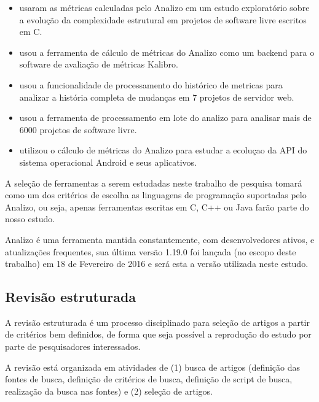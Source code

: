 \begin{itemize}

  \item \cite{Terceiro2009} usaram as métricas calculadas pelo Analizo em um
    estudo exploratório sobre a evolução da complexidade estrutural em
    projetos de software livre escritos em C.

  \item \cite{Morais2009} usou a ferramenta de cálculo de métricas do Analizo
    como um backend para o software de avaliação de métricas Kalibro.

  \item \cite{Terceiro2010} usou a funcionalidade de processamento do histórico
    de metricas para analizar a história completa de mudanças em 7 projetos de
    servidor web.

  \item \cite{Meirelles2010} usou a ferramenta de processamento em lote do
    analizo para analisar mais de 6000 projetos de software livre.

  \item \cite{Ronaldo2015} utilizou o cálculo de métricas do Analizo para
    estudar a ecoluçao da API do sistema operacional Android e seus aplicativos.

\end{itemize}

A seleção de ferramentas a serem estudadas neste trabalho de pesquisa tomará
como um dos critérios de escolha as linguagens de programação suportadas pelo
Analizo, ou seja, apenas ferramentas escritas em C, C++ ou Java farão parte do
nosso estudo.

Analizo é uma ferramenta mantida constantemente, com desenvolvedores ativos, e
atualizações frequentes, sua última versão 1.19.0 foi lançada (no escopo deste
trabalho) em 18 de
Fevereiro de 2016 e será esta a versão utilizada neste estudo.

\subsection{Revisão estruturada} \label{revisao-estruturada}

A revisão estruturada é um processo disciplinado para seleção de artigos a
partir de critérios bem definidos, de forma que seja possível a reprodução do
estudo por parte de pesquisadores interessados.

A revisão está organizada em atividades de (1) busca de artigos (definição
das fontes de busca, definição de critérios de busca, definição de script de
busca, realização da busca nas fontes) e (2) seleção de artigos. 

